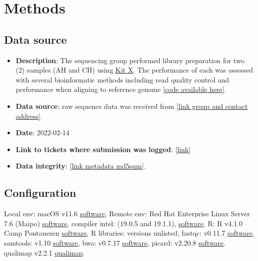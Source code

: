 \documentclass{article}
\begin{document}
\section{Methods}
\subsection{Data source}
 \label{data_source}

\begin{itemize}
\item \textbf{Description}: The sequencing group performed library preparation for two (2) samples (AH and CH) using \href{https://www.sophiagenetics.com/clinical/oncology/solid-tumors/}{Kit X}.
The performance of each was assessed with several bioinformatic methods including read quality control and performance when aligning to reference genome
[\href{https://github.com/DylanLawless/kit_assess}{code available here}].
\item \textbf{Data source}: raw sequence data was received from
 [\href{https://www.sophiagenetics.com}{link group and contact address}].
\item \textbf{Date}: 2022-02-14
\item \textbf{Link to tickets where submission was logged}: [\href{https://www.sophiagenetics.com}{link}]
\item \textbf{Data integrity}: [\href{https://github.com/DylanLawless/kit_assess/blob/master/src/raw.md5sum}{link metadata md5sum}].
\end{itemize}

\subsection{Configuration}

Local env: macOS v11.6 \href{https://support.apple.com/macos}{software},
Remote env: Red Hat Enterprise Linux Server 7.6 (Maipo)  \href{https://www.redhat.com/en/technologies/linux-platforms/enterprise-linux}{software},
compiler intel: (19.0.5 and 19.1.1),
\href{https://www.intel.com/content/www/us/en/developer/tools/oneapi/commercial-base-hpc.html#gs.ppyt3x}{software},
R: R v4.1.0 Camp Pontanezen  \href{https://www.r-project.org}{software},
R libraries: versions unlisted,
fastqc: v0.11.7 \href{https://www.bioinformatics.babraham.ac.uk/projects/fastqc/}{software},
samtools: v1.10 \href{https://www.htslib.org}{software},
bwa: v0.7.17 \href{https://janis.readthedocs.io/en/latest/tools/bioinformatics/bwa/bwamem.html}{software},
picard: v2.20.8  \href{http://broadinstitute.github.io/picard/}{software}.
qualimap v2.2.1 \href{http://qualimap.conesalab.org}{qualimap}.
\end{document}
